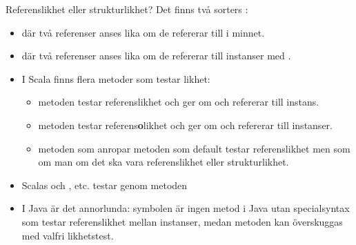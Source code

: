 


\begin{Slide}{Referenslikhet eller strukturlikhet?}\SlideFontSmall
Det finns två  sorters :
\begin{itemize}
\item {}  där två referenser anses lika om de refererar till  i minnet.
\item {}  där två referenser anses lika om de refererar till instanser med .

\pause

\item I Scala finns flera metoder som testar likhet:
\begin{itemize}\SlideFontSmall
\item metoden  testar referenslikhet och  ger  om  och  refererar till  instans.

\item metoden  testar referens\textbf{o}likhet och  ger  om  och  refererar till  instanser.

\item metoden \code{==} som anropar metoden  som default testar referenslikhet men som  om man  om det ska vara referenslikhet eller strukturlikhet.
\end{itemize}

\pause

\item Scalas  och  ,  etc. testar  genom metoden \code{==}
\pause
\item I Java är det annorlunda: symbolen \code{==} är ingen metod i Java utan specialsyntax som  testar referenslikhet mellan instanser, medan metoden  kan överskuggas med valfri likhetstest.
\end{itemize}
\end{Slide}


